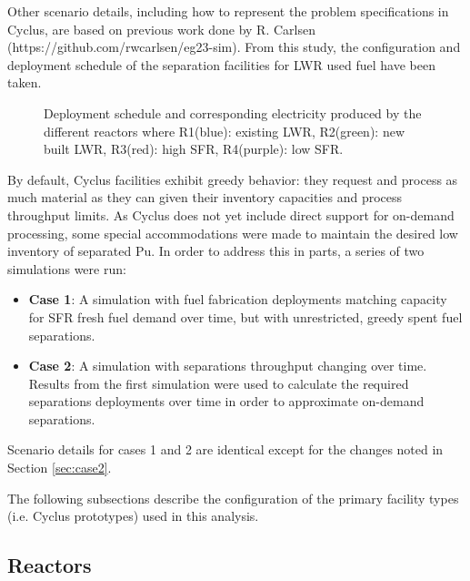 \documentclass[12pt]{article}
\begin{document}
Other scenario details, including how to represent the problem specifications in Cyclus,
are based on previous work done by R. Carlsen
(https://github.com/rwcarlsen/eg23-sim).  From this study, the configuration
and deployment schedule of the separation facilities for LWR used fuel have
been taken.

\begin{figure}[h!]
    \centering
    \caption{
        Deployment schedule and corresponding electricity produced by the
        different reactors where R1(blue): existing LWR, R2(green): new
        built LWR, R3(red): high SFR, R4(purple): low
        SFR.\label{fig:deployment}
    }
\end{figure}

By default, Cyclus facilities exhibit greedy behavior: they request and
process as much material as they can given their inventory capacities and
process throughput limits. As Cyclus does not yet include direct support for on-demand
processing, some special accommodations were made to maintain the desired low
inventory of separated Pu. In order to address this in parts, a series of two
simulations were run:

\begin{itemize}

    \item \textbf{Case 1}: A simulation with fuel fabrication deployments
        matching capacity for SFR fresh fuel demand over time, but with
        unrestricted, greedy spent fuel separations.

    \item \textbf{Case 2}: A simulation with separations throughput changing
        over time. Results from the first simulation were used to calculate
        the required separations deployments over time in order to approximate
        on-demand separations.

\end{itemize}

Scenario details for cases 1 and 2 are identical except for the changes noted in
Section \ref{sec:case2}.

The following subsections describe the configuration of the primary facility
types (i.e. Cyclus prototypes) used in this analysis.

\subsection{Reactors}
\end{document}
